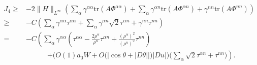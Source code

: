\documentclass[12pt]{article}
\numberwithin{equation}{section}
\theoremstyle{plain}
\theoremstyle{definition}
\theoremstyle{remark}
\begin{document}
\begin{equation} \label{eq:ang_J4_est}
\begin{split}
    J_4 \geq & -2 \| H \|_{L^{\infty}} \left( \sum_{\alpha} \gamma^{\alpha \alpha} \text{tr}(A\Phi^{\alpha \alpha}) +  \sum_{\alpha} \gamma^{\alpha n} \text{tr}(A\Phi^{\alpha n}) + \gamma^{n n} \text{tr}(A\Phi^{n n}) \right) \\
    \geq & - C \left( \sum_{\alpha} \gamma^{\alpha \alpha} \tau^{\alpha \alpha} +  \sum_{\alpha} \gamma^{\alpha n} \sqrt{2} \tau^{\alpha n} + \gamma^{n n} \tau^{n n}  \right) \\
    = & - C \left(  \sum_{\alpha} \gamma^{\alpha \alpha} \left( \tau^{\alpha \alpha} - \frac{2\rho^{\alpha}}{\rho^n} \tau^{\alpha n} + \frac{(\rho^{\alpha})^2}{(\rho^n)^2} \tau^{n n} \right)\right. \\
    & \quad\quad\quad\left.+ \Big(O(1) a_0 W + O\big(|\cos{\theta} + |D\theta||\big) |Du| \Big) \Big(\sum_{\alpha} \sqrt{2} \tau^{\alpha n} + \tau^{n n}\Big)  \right) .
\end{split}
\end{equation} 
\end{document}
